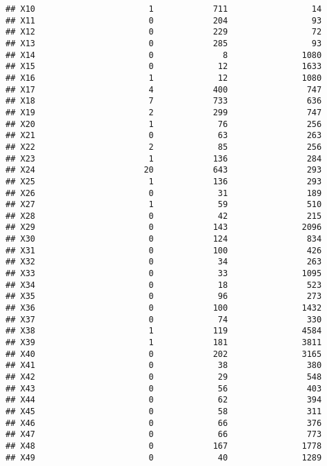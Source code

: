 \documentclass[12pt]{beamer}\usepackage[]{graphicx}\usepackage[]{color}
\makeatletter
\newenvironment{kframe}{%
 \def\at@end@of@kframe{}%
 \ifinner\ifhmode%
  \def\at@end@of@kframe{\end{minipage}}%
  \begin{minipage}{\columnwidth}%
 \fi\fi%
 \def\FrameCommand##1{\hskip\@totalleftmargin \hskip-\fboxsep
 \colorbox{shadecolor}{##1}\hskip-\fboxsep
     \hskip-\linewidth \hskip-\@totalleftmargin \hskip\columnwidth}%
 \MakeFramed {\advance\hsize-\width
   \@totalleftmargin\z@ \linewidth\hsize
   \@setminipage}}%
 {\par\unskip\endMakeFramed%
 \at@end@of@kframe}
\newenvironment{knitrout}{}{} %
\makeatother
\begin{document}
\begin{frame}[fragile]
\begin{knitrout}
\begin{kframe}
\begin{verbatim}
## X10                       1            711                 14
## X11                       0            204                 93
## X12                       0            229                 72
## X13                       0            285                 93
## X14                       0              8               1080
## X15                       0             12               1633
## X16                       1             12               1080
## X17                       4            400                747
## X18                       7            733                636
## X19                       2            299                747
## X20                       1             76                256
## X21                       0             63                263
## X22                       2             85                256
## X23                       1            136                284
## X24                      20            643                293
## X25                       1            136                293
## X26                       0             31                189
## X27                       1             59                510
## X28                       0             42                215
## X29                       0            143               2096
## X30                       0            124                834
## X31                       0            100                426
## X32                       0             34                263
## X33                       0             33               1095
## X34                       0             18                523
## X35                       0             96                273
## X36                       0            100               1432
## X37                       0             74                330
## X38                       1            119               4584
## X39                       1            181               3811
## X40                       0            202               3165
## X41                       0             38                380
## X42                       0             29                548
## X43                       0             56                403
## X44                       0             62                394
## X45                       0             58                311
## X46                       0             66                376
## X47                       0             66                773
## X48                       0            167               1778
## X49                       0             40               1289

\end{verbatim}
\end{kframe}
\end{knitrout}
\end{frame}
\end{document}
